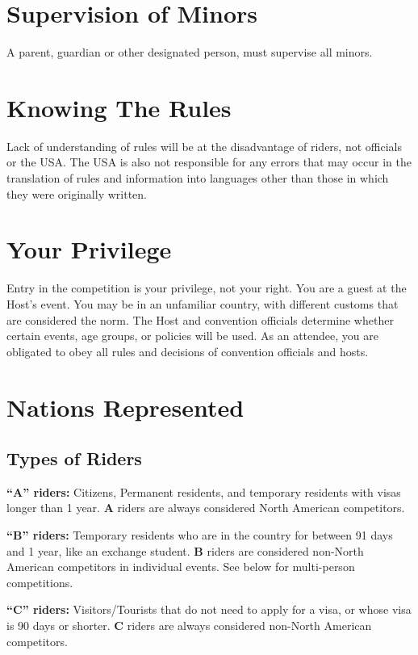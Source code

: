 \section{Supervision of Minors}
A parent, guardian or other designated person, must supervise all minors.

\section{Knowing The Rules}
Lack of understanding of rules will be at the disadvantage of riders, not officials or the USA.
The USA is also not responsible for any errors that may occur in the translation of rules and information into languages other than those in which they were originally written.

\section{Your Privilege}
Entry in the competition is your privilege, not your right.
You are a guest at the Host's event.
You may be in an unfamiliar country, with different customs that are considered the norm.
The Host and convention officials determine whether certain events, age groups, or policies will be used.
As an attendee, you are obligated to obey all rules and decisions of convention officials and hosts.

\section{Nations Represented}

\subsection{Types of Riders}

\textbf{``A'' riders:} Citizens, Permanent residents, and temporary residents with visas longer than 1 year.
\textbf{A} riders are always considered North American competitors.

\textbf{``B'' riders:}  Temporary residents who are in the country for between 91 days and 1 year, like an exchange student.
\textbf{B} riders are considered non-North American competitors in individual events. See below for multi-person competitions.

\textbf{``C'' riders:}  Visitors/Tourists that do not need to apply for a visa, or whose visa is 90 days or shorter.
\textbf{C} riders are always considered non-North American competitors.

